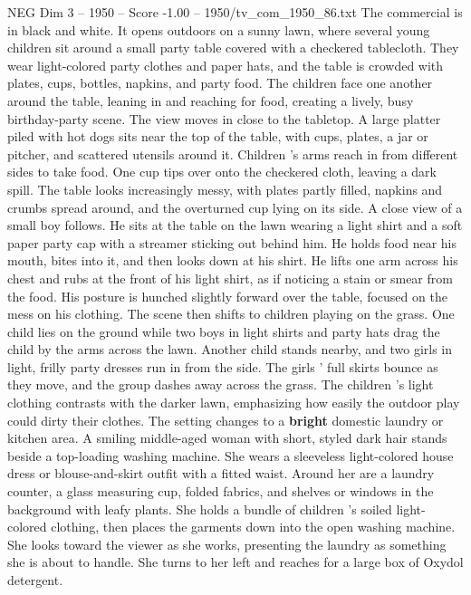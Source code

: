 \begin{textsample}{NEG Dim 3 – 1950 – Score -1.00 – 1950/tv\_com\_1950\_86.txt}  \label{ex:f3_neg_082}
The commercial is in black and white.
It opens outdoors on a sunny lawn, where several young children sit around a small party table covered with a checkered tablecloth.
They wear light-colored party clothes and paper hats, and the table is crowded with plates, cups, bottles, napkins, and party food.
The children face one another around the table, leaning in and reaching for food, creating a lively, busy birthday-party scene.
The view moves in close to the tabletop.
A large platter piled with hot dogs sits near the top of the table, with cups, plates, a jar or pitcher, and scattered utensils around it.
Children ’s arms reach in from different sides to take food.
One cup tips over onto the checkered cloth, leaving a dark spill.
The table looks increasingly messy, with plates partly filled, napkins and crumbs spread around, and the overturned cup lying on its side.
A close view of a small boy follows.
He sits at the table on the lawn wearing a light shirt and a soft paper party cap with a streamer sticking out behind him.
He holds food near his mouth, bites into it, and then looks down at his shirt.
He lifts one arm across his chest and rubs at the front of his light shirt, as if noticing a stain or smear from the food.
His posture is hunched slightly forward over the table, focused on the mess on his clothing.
The scene then shifts to children playing on the grass.
One child lies on the ground while two boys in light shirts and party hats drag the child by the arms across the lawn.
Another child stands nearby, and two girls in light, frilly party dresses run in from the side.
The girls ’ full skirts bounce as they move, and the group dashes away across the grass.
The children ’s light clothing contrasts with the darker lawn, emphasizing how easily the outdoor play could dirty their clothes.
The setting changes to a \textbf{bright} domestic laundry or kitchen area.
A smiling middle-aged woman with short, styled dark hair stands beside a top-loading washing machine.
She wears a sleeveless light-colored house dress or blouse-and-skirt outfit with a fitted waist.
Around her are a laundry counter, a glass measuring cup, folded fabrics, and shelves or windows in the background with leafy plants.
She holds a bundle of children ’s soiled light-colored clothing, then places the garments down into the open washing machine.
She looks toward the viewer as she works, presenting the laundry as something she is about to handle.
She turns to her left and reaches for a large box of Oxydol detergent.

\end{textsample}
